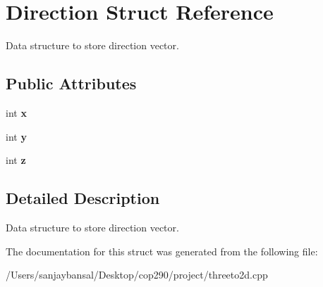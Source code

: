 \hypertarget{struct_direction}{}\section{Direction Struct Reference}
\label{struct_direction}


Data structure to store direction vector.  


\subsection*{Public Attributes}
\begin{DoxyCompactItemize}
\item 
\mbox{\label{struct_direction_a16cacf642c30484fba61e1dcf6ef0fd2}} 
int {\bfseries x}
\item 
\mbox{\label{struct_direction_ad2d2443d536649aac4edb8c5eeb8c16f}} 
int {\bfseries y}
\item 
\mbox{\label{struct_direction_a10627416eb8c3c3a75c858c5753b0796}} 
int {\bfseries z}
\end{DoxyCompactItemize}


\subsection{Detailed Description}
Data structure to store direction vector. 

The documentation for this struct was generated from the following file\+:\begin{DoxyCompactItemize}
\item 
/\+Users/sanjaybansal/\+Desktop/cop290/project/threeto2d.\+cpp\end{DoxyCompactItemize}
